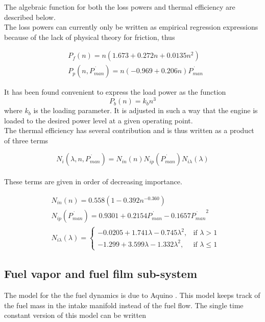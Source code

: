 \begin{appendices}
The algebraic function for both the loss powers and thermal efficiency are described below.
\\

The loss powers can currently only be written as empirical regression expressions because of the lack of physical theory for friction, thus

\begin{align}
&P_{f}(n) = n(1.673+0.272n+0.0135n^2)
\\
&P_{p}(n,\dot{P_{man}}) =n(-0.969+0.206n)\dot{P_{man}}
\end{align}

It has been found convenient to express the load power as the function
\begin{equation}
P_{b}(n)=k_{b}n^3
\end{equation}
where $k_{b}$ is the loading parameter. It is adjusted in such a way that the engine is loaded to the desired power level at a given operating point.\\

The thermal efficiency has several contribution and is thus written as a product of three terms

\begin{equation}
N_{i}(\lambda ,n, \dot{P_{man}}) = N_{in}(n) N_{ip}(\dot{P_{man}}) N_{i\lambda }(\lambda )
\end{equation}
\\
These terms are given in order of decreasing importance.

\begin{align}
&N_{in}(n)=0.558(1-0.392n^{-0.360})
\\
&N_{ip}(\dot{P_{man}})=0.9301+0.2154\dot{P_{man}}-0.1657\dot{P_{man}}^2
\\
&N_{i\lambda }(\lambda ) = \begin{cases} -0.0205+1.741\lambda -0.745\lambda ^2, & \mbox{if } \lambda > 1 \\ -1.299+3.599\lambda -1.332\lambda ^2, & \mbox{if } \lambda \leq 1 \end{cases}
\end{align}

\subsection*{Fuel vapor and fuel film sub-system}

The model for the the fuel dynamics is due to Aquino \cite{aquino1981transient}. This model keeps track of the fuel mass in the intake manifold instead of the fuel flow. The single time constant version of this model can be written


\end{appendices}

